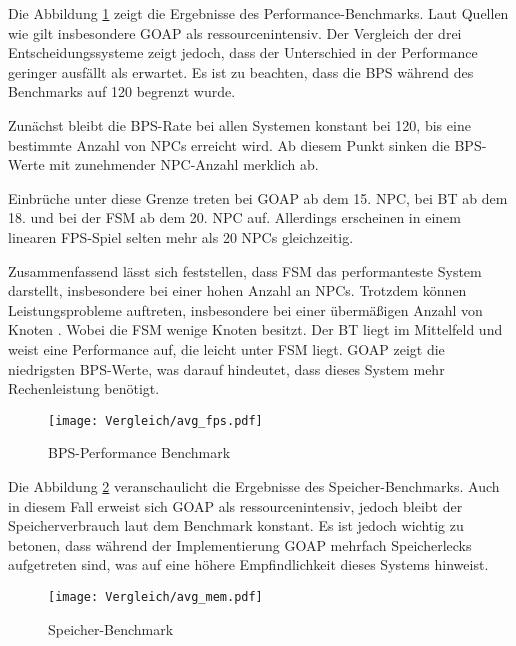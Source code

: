 Die Abbildung \ref{fig:bps benchmark} zeigt die Ergebnisse des Performance-Benchmarks. Laut Quellen wie \autocite{aiag} gilt insbesondere GOAP als ressourcenintensiv. Der Vergleich der drei Entscheidungssysteme zeigt jedoch, dass der Unterschied in der Performance geringer ausf\"{a}llt als erwartet. Es ist zu beachten, dass die BPS w\"{a}hrend des Benchmarks auf 120 begrenzt wurde. 

Zun\"{a}chst bleibt die BPS-Rate bei allen Systemen konstant bei 120, bis eine bestimmte Anzahl von NPCs erreicht wird. Ab diesem Punkt sinken die BPS-Werte mit zunehmender NPC-Anzahl merklich ab.

Einbr\"{u}che unter diese Grenze treten bei GOAP ab dem 15. NPC, bei BT ab dem 18. und bei der FSM ab dem 20. NPC auf. Allerdings erscheinen in einem linearen FPS-Spiel selten mehr als 20 NPCs gleichzeitig. 

Zusammenfassend l\"{a}sst sich feststellen, dass FSM das performanteste System darstellt, insbesondere bei einer hohen Anzahl an NPCs. Trotzdem k\"{o}nnen Leistungsprobleme auftreten, insbesondere bei einer \"{u}berm\"{a}\ss{}igen Anzahl von Knoten \autocite{U2023}. Wobei die FSM wenige Knoten besitzt. Der BT liegt im Mittelfeld und weist eine Performance auf, die leicht unter FSM liegt. GOAP zeigt die niedrigsten BPS-Werte, was darauf hindeutet, dass dieses System mehr Rechenleistung ben\"{o}tigt.

\begin{figure}[h]
  \centering
  \texttt{[image: Vergleich/avg\_fps.pdf]}
	\captionsetup{justification=justified, format=plain}
  \caption{BPS-Performance Benchmark}
  \label{fig:bps benchmark}
\end{figure}

Die Abbildung \ref{fig:mem benchmark} veranschaulicht die Ergebnisse des Speicher-Benchmarks. Auch in diesem Fall erweist sich GOAP als ressourcenintensiv, jedoch bleibt der Speicherverbrauch laut dem Benchmark konstant. Es ist jedoch wichtig zu betonen, dass w\"{a}hrend der Implementierung GOAP mehrfach Speicherlecks aufgetreten sind, was auf eine h\"{o}here Empfindlichkeit dieses Systems hinweist.

\begin{figure}[h]
  \centering
  \texttt{[image: Vergleich/avg\_mem.pdf]}
	\captionsetup{justification=justified, format=plain}
  \caption{Speicher-Benchmark}
  \label{fig:mem benchmark}
\end{figure}


\clearpage


